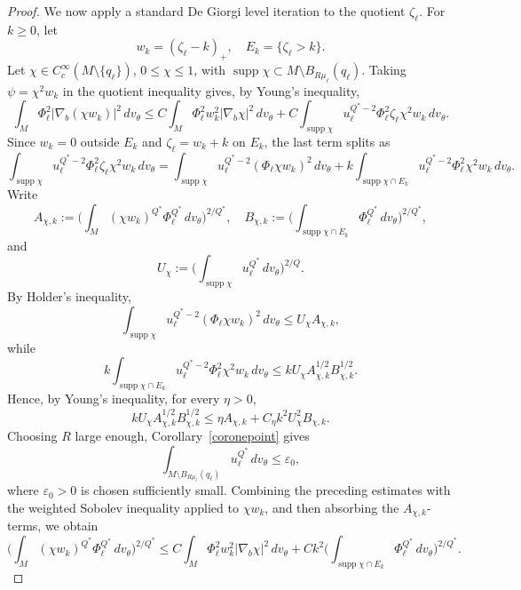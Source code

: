 \documentclass[11pt]{article}
\numberwithin{equation}{section}
\numberwithin{equation}{section}
\begin{document}
\begin{proof}
		We now apply a standard De Giorgi level iteration to the quotient \(\zeta_\ell\).  For \(k\ge0\), let
		\[
		w_k=(\zeta_\ell-k)_+,\quad E_k=\{\zeta_\ell>k\}.
		\]
		Let \(\chi\in C_c^\infty(M\setminus\{q_\ell\})\), \(0\le\chi\le1\), with \(\operatorname{supp}\chi\subset M\setminus B_{R\mu_\ell}(q_\ell)\).  Taking \(\psi=\chi^2w_k\) in the quotient inequality gives, by Young's inequality,
		\[
		\int_M\Phi_\ell^2|\nabla_b(\chi w_k)|^2\,dv_\theta \le C\int_M\Phi_\ell^2w_k^2|\nabla_b\chi|^2\,dv_\theta + C\int_{\operatorname{supp}\chi} u_\ell^{Q^*-2}\Phi_\ell^2\zeta_\ell\chi^2w_k\,dv_\theta .
		\]
		Since \(w_k=0\) outside \(E_k\) and \(\zeta_\ell=w_k+k\) on \(E_k\), the last term splits as
		\[
		\int_{\operatorname{supp}\chi} u_\ell^{Q^*-2}\Phi_\ell^2\zeta_\ell\chi^2w_k\,dv_\theta = \int_{\operatorname{supp}\chi} u_\ell^{Q^*-2}(\Phi_\ell\chi w_k)^2\,dv_\theta +k\int_{\operatorname{supp}\chi\cap E_k} u_\ell^{Q^*-2}\Phi_\ell^2\chi^2w_k\,dv_\theta .
		\]
		Write
		\[
		A_{\chi,k}:= \Big( \int_M(\chi w_k)^{Q^*}\Phi_\ell^{Q^*}\,dv_\theta \Big)^{2/Q^*}, \quad B_{\chi,k}:= \Big( \int_{\operatorname{supp}\chi\cap E_k}\Phi_\ell^{Q^*}\,dv_\theta \Big)^{2/Q^*},
		\]
		and
		\[
		U_\chi:= \Big( \int_{\operatorname{supp}\chi}u_\ell^{Q^*}\,dv_\theta \Big)^{2/Q}.
		\]
		By Holder's inequality,
		\[
		\int_{\operatorname{supp}\chi} u_\ell^{Q^*-2}(\Phi_\ell\chi w_k)^2\,dv_\theta \le U_\chi A_{\chi,k},
		\]
		while
		\[
		k\int_{\operatorname{supp}\chi\cap E_k} u_\ell^{Q^*-2}\Phi_\ell^2\chi^2w_k\,dv_\theta \le kU_\chi A_{\chi,k}^{1/2}B_{\chi,k}^{1/2}.
		\]
		Hence, by Young's inequality, for every \(\eta>0\),
		\[
		kU_\chi A_{\chi,k}^{1/2}B_{\chi,k}^{1/2} \le \eta A_{\chi,k}+C_\eta k^2U_\chi^2B_{\chi,k}.
		\]
		Choosing \(R\) large enough, Corollary~\ref{coronepoint} gives
		\[
		\int_{M\setminus B_{R\mu_\ell}(q_\ell)}u_\ell^{Q^*}\,dv_\theta\le\varepsilon_0,
		\]
		where \(\varepsilon_0>0\) is chosen sufficiently small.  Combining the preceding estimates with the weighted Sobolev inequality applied to \(\chi w_k\), and then absorbing the \(A_{\chi,k}\)-terms, we obtain
		\begin{equation}\label{eququotient}
			\Big( \int_M(\chi w_k)^{Q^*}\Phi_\ell^{Q^*}\,dv_\theta \Big)^{2/Q^*} \le C\int_M\Phi_\ell^2w_k^2|\nabla_b\chi|^2\,dv_\theta + Ck^2 \Big( \int_{\operatorname{supp}\chi\cap E_k}\Phi_\ell^{Q^*}\,dv_\theta \Big)^{2/Q^*}.
		\end{equation}
		

\end{proof}
\end{document}
